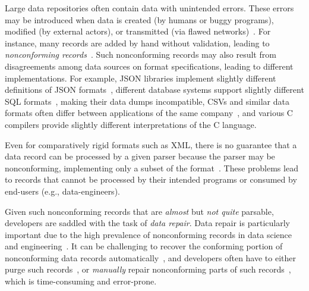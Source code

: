\documentclass[acmsmall,screen,review,anonymous]{acmart}
\newcommand{\dtask}{data repair\xspace}
\newcommand{\Dtask}{Data repair\xspace}
\begin{document}
\label{sec:intro}

Large data repositories often contain data with unintended errors. These errors
may be introduced when data is created (by humans or buggy programs), modified
(by external actors), or transmitted (via flawed networks)~\cite{scaffidi2008accommodating}.
For instance, many records are added by hand without validation, leading to
\textit{nonconforming records}~\cite{mucslu2015preventing}. Such nonconforming
records may also result from disagreements among data sources on format
specifications, leading to different implementations. For example, JSON
libraries implement slightly different definitions of JSON formats~\cite{harrand2021behavioral,seriot2016parsing},
different database systems support slightly different SQL formats~\cite{arvin2018comparison},
making their data dumps incompatible,
CSVs and similar data formats often differ between applications of the same
company~\cite{taocp},
and various C compilers provide slightly different interpretations of the C language.

Even for comparatively rigid formats such as XML, there is no guarantee
that a data record can be processed by a given parser because the parser may
be nonconforming, implementing only a subset of the format~\cite{xmlconformance}.
These problems lead to records that cannot be processed by their
intended programs or consumed by end-users (e.g., data-engineers).

Given such nonconforming records that are \emph{almost} but \emph{not quite}
parsable, developers are saddled with the task of \textit{\dtask}.
\Dtask is particularly important due to the high prevalence of nonconforming
records in data science and engineering~\cite{ridzuan2019review,kirschner2020debugging}.
It can be challenging to recover the conforming portion of nonconforming
data records automatically~\cite{scaffidi2008topes,ridzuan2019review},
and developers often have to either purge such records~\cite{hernandez1998real},
or \emph{manually} repair nonconforming parts of such records~\cite{kirschner2020debugging},
which is time-consuming and error-prone.
\end{document}
